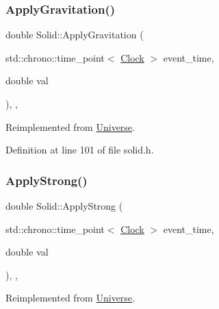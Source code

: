 \mbox{\label{class_solid_af2b3133138ce2482faa462d07aa23042}} 
\subsubsection{\texorpdfstring{Apply\+Gravitation()}{ApplyGravitation()}}
{\footnotesize\ttfamily double Solid\+::\+Apply\+Gravitation (\begin{DoxyParamCaption}\item[{std\+::chrono\+::time\+\_\+point$<$ \mbox{\hyperlink{universe_8h_a0ef8d951d1ca5ab3cfaf7ab4c7a6fd80}{Clock}} $>$}]{event\+\_\+time,  }\item[{double}]{val }\end{DoxyParamCaption})\hspace{0.3cm}{\ttfamily [inline]}, {\ttfamily [final]}, {\ttfamily [virtual]}}



Reimplemented from \mbox{\hyperlink{class_universe_a76c0b5e63c2a7d1988c44db341c3d64c}{Universe}}.



Definition at line 101 of file solid.\+h.

\mbox{\label{class_solid_a0801ec0382bc509191575bcf9f5c83c1}} 
\subsubsection{\texorpdfstring{Apply\+Strong()}{ApplyStrong()}}
{\footnotesize\ttfamily double Solid\+::\+Apply\+Strong (\begin{DoxyParamCaption}\item[{std\+::chrono\+::time\+\_\+point$<$ \mbox{\hyperlink{universe_8h_a0ef8d951d1ca5ab3cfaf7ab4c7a6fd80}{Clock}} $>$}]{event\+\_\+time,  }\item[{double}]{val }\end{DoxyParamCaption})\hspace{0.3cm}{\ttfamily [inline]}, {\ttfamily [final]}, {\ttfamily [virtual]}}



Reimplemented from \mbox{\hyperlink{class_universe_a906a88b37f10bfa630bef49dfd0e907a}{Universe}}.



